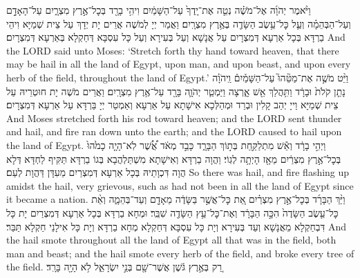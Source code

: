 {%
{וַיֹּ֨אמֶר יְהֹוָ֜ה אֶל־מֹשֶׁ֗ה נְטֵ֤ה אֶת־יָֽדְךָ֙ עַל־הַשָּׁמַ֔יִם וִיהִ֥י בָרָ֖ד בְּכׇל־אֶ֣רֶץ מִצְרָ֑יִם עַל־הָאָדָ֣ם וְעַל־הַבְּהֵמָ֗ה וְעַ֛ל כׇּל־עֵ֥שֶׂב הַשָּׂדֶ֖ה בְּאֶ֥רֶץ מִצְרָֽיִם׃
}
{וַאֲמַר יְיָ לְמֹשֶׁה אֲרֵים יָת יְדָךְ עַל צֵית שְׁמַיָּא וִיהֵי בַרְדָּא בְּכָל אַרְעָא דְּמִצְרָיִם עַל אֲנָשָׁא וְעַל בְּעִירָא וְעַל כָּל עִסְבָּא דְּחַקְלָא בְּאַרְעָא דְּמִצְרָיִם׃}
{And the LORD said unto Moses: ‘Stretch forth thy hand toward heaven, that there may be hail in all the land of Egypt, upon man, and upon beast, and upon every herb of the field, throughout the land of Egypt.’}{}
{וַיֵּ֨ט מֹשֶׁ֣ה אֶת־מַטֵּ֘הוּ֮ עַל־הַשָּׁמַ֒יִם֒ וַֽיהֹוָ֗ה נָתַ֤ן קֹלֹת֙ וּבָרָ֔ד וַתִּ֥הֲלַךְ אֵ֖שׁ אָ֑רְצָה וַיַּמְטֵ֧ר יְהֹוָ֛ה בָּרָ֖ד עַל־אֶ֥רֶץ מִצְרָֽיִם׃}
{וַאֲרֵים מֹשֶׁה יָת חוּטְרֵיהּ עַל צֵית שְׁמַיָּא וַייָ יְהַב קָלִין וּבְרַד וּמְהַלְּכָא אִישָׁתָא עַל אַרְעָא וְאַמְטַר יְיָ בַּרְדָּא עַל אַרְעָא דְּמִצְרָיִם׃}
{And Moses stretched forth his rod toward heaven; and the LORD sent thunder and hail, and fire ran down unto the earth; and the LORD caused to hail upon the land of Egypt.}{}
{וַיְהִ֣י בָרָ֔ד וְאֵ֕שׁ מִתְלַקַּ֖חַת בְּת֣וֹךְ הַבָּרָ֑ד כָּבֵ֣ד מְאֹ֔ד אֲ֠שֶׁ֠ר לֹֽא־הָיָ֤ה כָמֹ֙הוּ֙ בְּכׇל־אֶ֣רֶץ מִצְרַ֔יִם מֵאָ֖ז הָיְתָ֥ה לְגֽוֹי׃
}
{וַהֲוָה בַרְדָּא וְאִישָׁתָא מִשְׁתַּלְהֲבָא בְּגוֹ בַרְדָּא תַּקִּיף לַחְדָּא דְּלָא הֲוָה דִּכְוָתֵיהּ בְּכָל אַרְעָא דְּמִצְרַיִם מֵעִדָּן דַּהֲוָת לְעַם׃}
{So there was hail, and fire flashing up amidst the hail, very grievous, such as had not been in all the land of Egypt since it became a nation.}{}
{וַיַּ֨ךְ הַבָּרָ֜ד בְּכׇל־אֶ֣רֶץ מִצְרַ֗יִם אֵ֚ת כׇּל־אֲשֶׁ֣ר בַּשָּׂדֶ֔ה מֵאָדָ֖ם וְעַד־בְּהֵמָ֑ה וְאֵ֨ת כׇּל־עֵ֤שֶׂב הַשָּׂדֶה֙ הִכָּ֣ה הַבָּרָ֔ד וְאֶת־כׇּל־עֵ֥ץ הַשָּׂדֶ֖ה שִׁבֵּֽר׃}
{וּמְחָא בַרְדָּא בְּכָל אַרְעָא דְּמִצְרַיִם יָת כָּל דִּבְחַקְלָא מֵאֲנָשָׁא וְעַד בְּעִירָא וְיָת כָּל עִסְבָּא דְּחַקְלָא מְחָא בַרְדָּא וְיָת כָּל אִילָנֵי חַקְלָא תַּבַּר׃}
{And the hail smote throughout all the land of Egypt all that was in the field, both man and beast; and the hail smote every herb of the field, and broke every tree of the field.}{}
{רַ֚ק בְּאֶ֣רֶץ גֹּ֔שֶׁן אֲשֶׁר־שָׁ֖ם בְּנֵ֣י יִשְׂרָאֵ֑ל לֹ֥א הָיָ֖ה בָּרָֽד׃}
}
